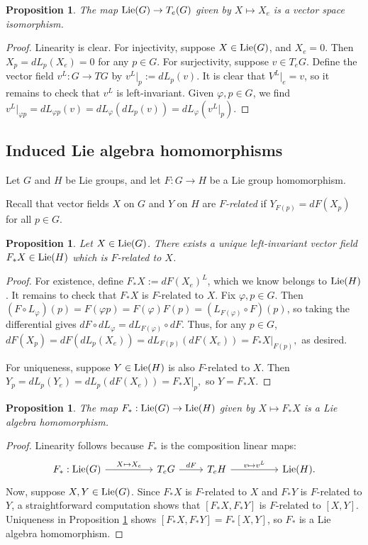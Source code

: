 \documentclass{amsart}
\newcommand{\lie}{\text{\normalfont Lie}}
\theoremstyle{plain}
\newtheorem{proposition}[theorem]{Proposition}
\theoremstyle{definition}
\theoremstyle{remark}
\begin{document}
	\begin{proposition}
		The map $\lie(G) \rightarrow T_e(G)$ given by $X \mapsto X_e$ is a vector space isomorphism.
	\end{proposition}
	\begin{proof}
		Linearity is clear. For injectivity, suppose $X \in \lie(G)$, and $X_e = 0$. Then $X_p = dL_p(X_e) = 0$ for any $p \in G$. For surjectivity, suppose $v \in T_e G$. Define the vector field  $v^L:G \rightarrow TG$ by $v^L|_p := dL_p(v)$. It is clear that $V^L|_e = v$, so it remains to check that $v^L$ is left-invariant. Given $\varphi,p \in G$, we find 
		$v^L|_{\varphi p} = dL_{\varphi p}(v) = dL_{\varphi}(dL_p(v)) = dL_\varphi(v^L|_p).$
	\end{proof}
	
	\subsection{Induced Lie algebra homomorphisms}
	Let $G$ and $H$ be Lie groups, and let $F:G \rightarrow H$ be a Lie group homomorphism.
	
	Recall that vector fields $X$ on $G$ and $Y$ on $H$ are \emph{$F$-related} if $Y_{F(p)} = dF(X_p)$ for all $p \in G$.
	\begin{proposition}
		\label{uniqueness of induced}
		Let $X \in \lie(G)$. There exists a unique left-invariant vector field $F_*X \in \lie(H)$ which is $F$-related to $X$.
	\end{proposition}
	\begin{proof}
		For existence, define $F_*X := dF(X_e)^L$, which we know belongs to $\lie(H)$. It remains to check that $F_*X$ is $F$-related to $X$. Fix $\varphi,p \in G$. Then $(F \circ L_\varphi)(p) = F(\varphi p) = F(\varphi) F(p) = (L_{F(\varphi)} \circ F)(p)$, so taking the differential gives $dF \circ dL_\varphi = dL_{F(\varphi)} \circ dF$. Thus, for any $p \in G$, 
		$dF(X_p) = dF(dL_p(X_e)) = dL_{F(p)}(dF(X_e)) = F_*X|_{F(p)},$
		 as desired.
		 
		 For uniqueness, suppose $Y \in \lie(H)$ is also $F$-related to $X$. Then 
		 $Y_p = dL_p(Y_e) = dL_p(dF(X_e)) = F_* X|_p, $
		 so $Y= F_* X$. 
	\end{proof}
	
	\begin{proposition}
		The map $F_*:\lie(G) \rightarrow \lie(H)$ given by $X \mapsto F_* X$ is a Lie algebra homomorphism.
	\end{proposition}
	\begin{proof}
		Linearity follows because $F_*$ is the composition linear maps:
		$$\begin{tikzcd}
			F_*: \lie(G) \arrow{rr}{X \mapsto X_e}&& T_eG \arrow{r}{dF}& T_e H \arrow{rr}{v \mapsto v^L}&& \lie(H).
		\end{tikzcd}$$
		Now, suppose $X,Y \in \lie(G)$. Since $F_*X$ is $F$-related to $X$ and $F_*Y$ is $F$-related to $Y$, a straightforward computation shows that $[F_*X,F_* Y]$ is $F$-related to $[X,Y]$. Uniqueness in Proposition \ref{uniqueness of induced} shows $[F_*X,F_* Y] = F_*[X,Y]$, so $F_*$ is a Lie algebra homomorphism.
	\end{proof}
\end{document}
